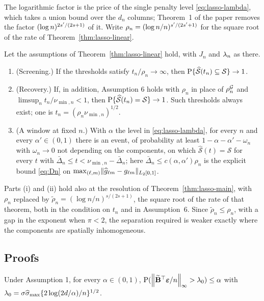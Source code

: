 The logarithmic factor is the price of the single penalty level
\eqref{eq:lasso-lambda}, which takes a union bound over the $d_n$ columns;
Theorem~1 of the paper removes the factor $(\log n)^{2s'/(2s+1)}$ of it.
Write $\rho_n = (\log n/n)^{s'/(2s'+1)}$ for the square root of the rate
of Theorem~\ref{thm:lasso-linear}.

\begin{corollary}
\label{cor:lasso-threshold}
Let the assumptions of Theorem~\ref{thm:lasso-linear} hold, with $J_n$ and
$\lambda_{n}$ as there.
\begin{enumerate}
\item[(i)] (Screening.) If the thresholds satisfy $t_n/\rho_n \to \infty$,
then $\mathrm{P}\{\widehat{\mathcal{S}}(t_n) \subseteq \mathcal{S}\} \to 1$.
\item[(ii)] (Recovery.) If, in addition, Assumption 6 holds with $\rho_n$ in
place of $\rho^{\mathcal{G}}_{n}$ and $\limsup_n t_n/\nu_{\min,n} < 1$, then
$\mathrm{P}\{\widehat{\mathcal{S}}(t_n) = \mathcal{S}\} \to 1$. Such thresholds
always exist; one is $t_n = (\rho_n\nu_{\min,n})^{1/2}$.
\item[(iii)] (A window at fixed $n$.) With $\alpha$ the level in
\eqref{eq:lasso-lambda}, for every $n$ and every $\alpha' \in (0,1)$ there is
an event, of probability at least $1 - \alpha - \alpha' - \omega_n$ with
$\omega_n \to 0$ not depending on the components, on which
$\widehat{\mathcal{S}}(t) = \mathcal{S}$ for every $t$ with
$\bar{\Delta}_n \le t < \nu_{\min,n} - \bar{\Delta}_n$; here
$\bar{\Delta}_n \le c(\alpha,\alpha')\rho_n$ is the explicit bound
\eqref{eq:Dn} on $\max_{(\ell,m)}\lVert \widehat{g}_{\ell m} -
g_{\ell m}\rVert_{L_2[0,1]}$.
\end{enumerate}
\end{corollary}

Parts (i) and (ii) hold also at the resolution of
Theorem~\ref{thm:lasso-main}, with $\rho_n$ replaced by
$\tilde\rho_n = (\log n/n)^{s/(2s+1)}$, the square root of the rate of that
theorem, both in the condition on $t_n$ and in Assumption~6. Since
$\tilde\rho_n \le \rho_n$, with a gap in the exponent when $\pi < 2$, the
separation required is weaker exactly where the components are spatially
inhomogeneous.

\subsection*{Proofs}

\begin{lemma}
\label{lem:calib}
Under Assumption 1, for every $\alpha \in (0,1)$,
$\mathrm{P}(\left\lVert \widetilde{\mathbf{B}}^{\top}\boldsymbol{\varepsilon}/n \right\rVert_{\infty} > \lambda_0) \le \alpha$ with
$\lambda_0 = \sigma\widehat{\sigma}_{\max}\{2\log(2d/\alpha)/n\}^{1/2}$.
\end{lemma}


